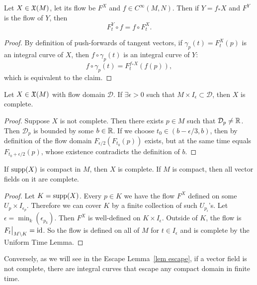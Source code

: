 \begin{cor}\label{cor naturality of flows}
Let $X\in\mathfrak{X}(M)$, let its flow be $F^X$ and $f\in C^\infty(M,N)$. Then if $Y=f_\ast X$ and $F^Y$ is the flow of $Y$, then 
\[F^Y_t\circ f=f\circ F^X_t.\]
\end{cor}
\begin{proof}
By definition of push-forwards of tangent vectors, if $\gamma_p(t)=F_t^X(p)$ is an integral curve of $X$, then $f\circ \gamma_p(t)$ is an integral curve of $Y$:
\[f\circ \gamma_p(t)=F^{f_\ast X}_t(f(p)),\]
which is equivalent to the claim.
\end{proof}

\begin{thm}
Let $X\in\mathfrak{X}(M)$ with flow domain $\mathcal{D}$. If $\exists\epsilon>0$ such that $M\times I_\epsilon\subset\mathcal{D}$, then $X$ is complete.
\end{thm}
\begin{proof}
Suppose $X$ is not complete. Then there exists $p\in M$ such that $\mathcal{D}_p\neq \mathbb{R} $. Then $\mathcal{D}_p$ is bounded by some $b\in\mathbb{R} $. If we choose $t_0\in(b-\epsilon/3,b)$, then by definition of the flow domain $F_{\epsilon/2}(F_{t_0}(p))$ exists, but at the same time equals $F_{t_0+\epsilon/2}(p)$, whose existence contradicts the definition of $b$.
\end{proof}
\begin{cor}
If $\operatorname{supp} (X)$ is compact in $M$, then $X$ is complete. If $M$ is compact, then all vector fields on it are complete.
\end{cor}
\begin{proof}
Let $K=\operatorname{supp}(X)$. Every $p\in K$ we have the flow $F^X$ defined on some $U_p\times I_{\epsilon_p}$. Therefore we can cover $K$ by a finite collection of such $U_{p_i}$'s. Let $\epsilon=\min_k(\epsilon_{p_k})$. Then $F^X$ is well-defined on $K\times I_\epsilon$. Outside of $K$, the flow is $\restr{F_t}{M\setminus K}=\id$. So the flow is defined on all of $M$ for $t\in I_\epsilon$ and is complete by the Uniform Time Lemma.
\end{proof}

Conversely, as we will see in the Escape Lemma~\ref{lem escape}, if a vector field is not complete, there are integral curves that escape any compact domain in finite time.


